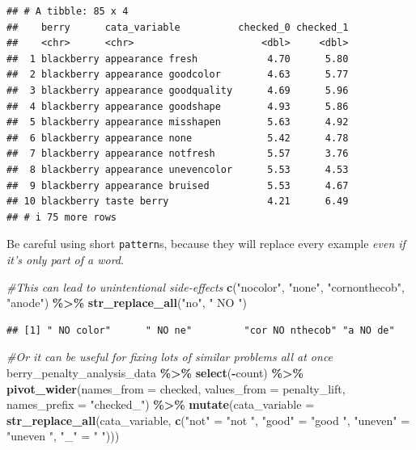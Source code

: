 \documentclass[
]{book}
\newenvironment{Shaded}{\begin{snugshade}}{\end{snugshade}}
\newcommand{\AttributeTok}[1]{\textcolor[rgb]{0.13,0.29,0.53}{#1}}
\newcommand{\CommentTok}[1]{\textcolor[rgb]{0.56,0.35,0.01}{\textit{#1}}}
\newcommand{\FunctionTok}[1]{\textcolor[rgb]{0.13,0.29,0.53}{\textbf{#1}}}
\newcommand{\NormalTok}[1]{#1}
\newcommand{\OtherTok}[1]{\textcolor[rgb]{0.56,0.35,0.01}{#1}}
\newcommand{\SpecialCharTok}[1]{\textcolor[rgb]{0.81,0.36,0.00}{\textbf{#1}}}
\newcommand{\StringTok}[1]{\textcolor[rgb]{0.31,0.60,0.02}{#1}}
\begin{document}
\begin{verbatim}
## # A tibble: 85 x 4
##    berry      cata_variable          checked_0 checked_1
##    <chr>      <chr>                      <dbl>     <dbl>
##  1 blackberry appearance fresh            4.70      5.80
##  2 blackberry appearance goodcolor        4.63      5.77
##  3 blackberry appearance goodquality      4.69      5.96
##  4 blackberry appearance goodshape        4.93      5.86
##  5 blackberry appearance misshapen        5.63      4.92
##  6 blackberry appearance none             5.42      4.78
##  7 blackberry appearance notfresh         5.57      3.76
##  8 blackberry appearance unevencolor      5.53      4.53
##  9 blackberry appearance bruised          5.53      4.67
## 10 blackberry taste berry                 4.21      6.49
## # i 75 more rows
\end{verbatim}

Be careful using short \texttt{pattern}s, because they will replace every example \emph{even if it's only part of a word}.

\begin{Shaded}
\begin{Highlighting}[]
\CommentTok{\#This can lead to unintentional side{-}effects}
\FunctionTok{c}\NormalTok{(}\StringTok{"nocolor"}\NormalTok{, }\StringTok{"none"}\NormalTok{, }\StringTok{"cornonthecob"}\NormalTok{, }\StringTok{"anode"}\NormalTok{) }\SpecialCharTok{\%\textgreater{}\%}
  \FunctionTok{str\_replace\_all}\NormalTok{(}\StringTok{"no"}\NormalTok{, }\StringTok{" NO "}\NormalTok{)}
\end{Highlighting}
\end{Shaded}

\begin{verbatim}
## [1] " NO color"      " NO ne"         "cor NO nthecob" "a NO de"
\end{verbatim}

\begin{Shaded}
\begin{Highlighting}[]
\CommentTok{\#Or it can be useful for fixing lots of similar problems all at once}
\NormalTok{berry\_penalty\_analysis\_data }\SpecialCharTok{\%\textgreater{}\%}
  \FunctionTok{select}\NormalTok{(}\SpecialCharTok{{-}}\NormalTok{count) }\SpecialCharTok{\%\textgreater{}\%}
  \FunctionTok{pivot\_wider}\NormalTok{(}\AttributeTok{names\_from =}\NormalTok{ checked,}
              \AttributeTok{values\_from =}\NormalTok{ penalty\_lift,}
              \AttributeTok{names\_prefix =} \StringTok{"checked\_"}\NormalTok{) }\SpecialCharTok{\%\textgreater{}\%}
  \FunctionTok{mutate}\NormalTok{(}\AttributeTok{cata\_variable =} \FunctionTok{str\_replace\_all}\NormalTok{(cata\_variable,}
                                         \FunctionTok{c}\NormalTok{(}\StringTok{"not"} \OtherTok{=} \StringTok{"not "}\NormalTok{,}
                                           \StringTok{"good"} \OtherTok{=} \StringTok{"good "}\NormalTok{,}
                                           \StringTok{"uneven"} \OtherTok{=} \StringTok{"uneven "}\NormalTok{,}
                                           \StringTok{"\_"} \OtherTok{=} \StringTok{" "}\NormalTok{)))}
\end{Highlighting}
\end{Shaded}
\end{document}
